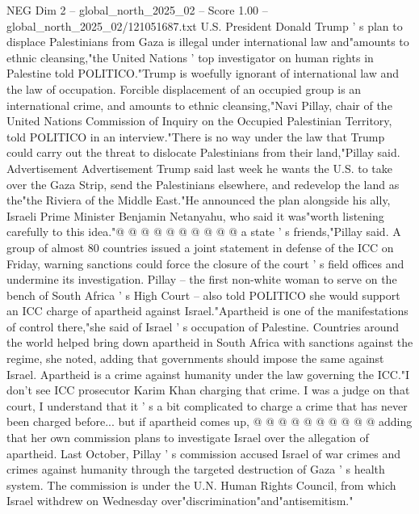 \begin{textsample}{NEG Dim 2 – global\_north\_2025\_02 – Score 1.00 – global\_north\_2025\_02/121051687.txt}  \label{ex:f2_neg_018}
U.S.
President Donald Trump ' s plan to displace Palestinians from Gaza is illegal under international law and"amounts to ethnic cleansing,"the United Nations ' top investigator on human rights in Palestine told POLITICO."Trump is woefully ignorant of international law and the law of occupation.
Forcible displacement of an occupied group is an international crime, and amounts to ethnic cleansing,"Navi Pillay, chair of the United Nations Commission of Inquiry on the Occupied Palestinian Territory, told POLITICO in an interview."There is no way under the law that Trump could carry out the threat to dislocate Palestinians from their land,"Pillay said.
Advertisement Advertisement Trump said last week he wants the U.S. to take over the Gaza Strip, send the Palestinians elsewhere, and redevelop the land as the"the Riviera of the Middle East."He announced the plan alongside his ally, Israeli Prime Minister Benjamin Netanyahu, who said it was"worth listening carefully to this idea."@ @ @ @ @ @ @ @ @ @ a state ' s friends,"Pillay said.
A group of almost 80 countries issued a joint statement in defense of the ICC on Friday, warning sanctions could force the closure of the court ' s field offices and undermine its investigation.
Pillay -- the first non-white woman to serve on the bench of South Africa ' s High Court -- also told POLITICO she would support an ICC charge of apartheid against Israel."Apartheid is one of the manifestations of control there,"she said of Israel ' s occupation of Palestine.
Countries around the world helped bring down apartheid in South Africa with sanctions against the regime, she noted, adding that governments should impose the same against Israel.
Apartheid is a crime against humanity under the law governing the ICC."I don't see ICC prosecutor Karim Khan charging that crime.
I was a judge on that court, I understand that it ' s a bit complicated to charge a crime that has never been charged before... but if apartheid comes up, @ @ @ @ @ @ @ @ @ @ adding that her own commission plans to investigate Israel over the allegation of apartheid.
Last October, Pillay ' s commission accused Israel of war crimes and crimes against humanity through the targeted destruction of Gaza ' s health system.
The commission is under the U.N.
Human Rights Council, from which Israel withdrew on Wednesday over"discrimination"and"antisemitism."

\end{textsample}
